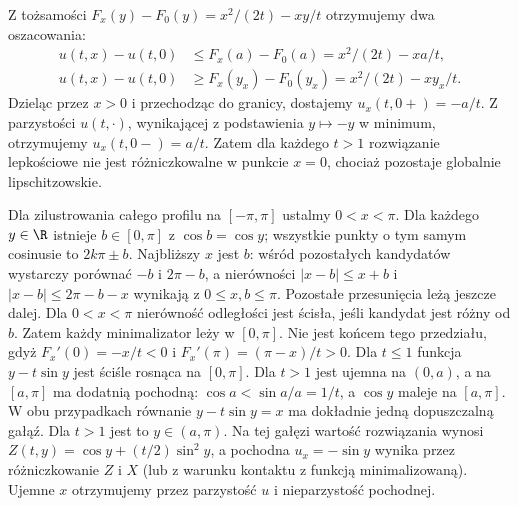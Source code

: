 \begin{przyklad}
Z tożsamości $F_x(y)-F_0(y)=x^2/(2t)-xy/t$
otrzymujemy dwa oszacowania:
\[
 \begin{split}
 u(t,x)-u(t,0)&\le F_x(a)-F_0(a)
             =x^2/(2t)-xa/t,\\
 u(t,x)-u(t,0)&\ge F_x(y_x)-F_0(y_x)
             =x^2/(2t)-xy_x/t .
 \end{split}
\]
Dzieląc przez $x>0$ i przechodząc do granicy,
dostajemy $u_x(t,0+)=-a/t$. Z parzystości
$u(t,\cdot)$, wynikającej z podstawienia
$y\mapsto-y$ w minimum, otrzymujemy
$u_x(t,0-)=a/t$.
Zatem dla każdego $t>1$ rozwiązanie lepkościowe
nie jest różniczkowalne w punkcie $x=0$,
chociaż pozostaje globalnie lipschitzowskie.

Dla zilustrowania całego profilu na $[-\pi,\pi]$
ustalmy $0<x<\pi$. Dla każdego $y\in\R$ istnieje
$b\in[0,\pi]$ z $\cos b=\cos y$; wszystkie
punkty o tym samym cosinusie to $2k\pi\pm b$.
Najbliższy $x$ jest $b$: wśród pozostałych
kandydatów wystarczy porównać $-b$ i $2\pi-b$,
a nierówności
$|x-b|\le x+b$ i $|x-b|\le 2\pi-b-x$
wynikają z $0\le x,b\le\pi$.
Pozostałe przesunięcia leżą jeszcze dalej.
Dla $0<x<\pi$ nierówność odległości jest
ścisła, jeśli kandydat jest różny od $b$.
Zatem każdy minimalizator leży w $[0,\pi]$.
Nie jest końcem tego przedziału, gdyż
$F_x'(0)=-x/t<0$ i $F_x'(\pi)=(\pi-x)/t>0$.
Dla $t\le1$ funkcja $y-t\sin y$ jest
ściśle rosnąca na $[0,\pi]$. Dla $t>1$
jest ujemna na $(0,a)$, a na $[a,\pi]$
ma dodatnią pochodną: $\cos a<\sin a/a=1/t$,
a $\cos y$ maleje na $[a,\pi]$.
W obu przypadkach równanie $y-t\sin y=x$
ma dokładnie jedną dopuszczalną gałąź.
Dla $t>1$ jest to $y\in(a,\pi)$.
Na tej gałęzi wartość rozwiązania wynosi
$Z(t,y)=\cos y+(t/2)\sin^2 y$, a pochodna
$u_x=-\sin y$ wynika przez różniczkowanie
$Z$ i $X$ (lub z warunku kontaktu z funkcją
minimalizowaną). Ujemne $x$ otrzymujemy
przez parzystość $u$ i nieparzystość pochodnej.
\end{przyklad}

